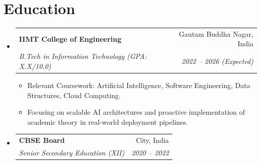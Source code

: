 \documentclass[letterpaper,11pt]{article}
\makeatletter
\newcommand{\resumeItem}[1]{
  \item\small{
    {#1 \vspace{-2pt}}
  }
}
\newcommand{\resumeSubheading}[4]{
  \vspace{-2pt}\item
    \begin{tabular*}{0.97\textwidth}[t]{l@{\extracolsep{\fill}}r}
      \textbf{#1} & #2 \\
      \textit{\small#3} & \textit{\small #4} \\
    \end{tabular*}\vspace{-7pt}
}
\newcommand{\resumeSubHeadingListStart}{\begin{itemize}[leftmargin=0.15in, label={}]}
\newcommand{\resumeSubHeadingListEnd}{\end{itemize}}
\newcommand{\resumeItemListStart}{\begin{itemize}}
\newcommand{\resumeItemListEnd}{\end{itemize}\vspace{-5pt}}
\makeatother
\begin{document}
\section{Education}
  \resumeSubHeadingListStart
    \resumeSubheading
      {IIMT College of Engineering}{Gautam Buddha Nagar, India}
      {B.Tech in Information Technology (GPA: X.X/10.0)}{2022 -- 2026 (Expected)}
      \resumeItemListStart
        \resumeItem{Relevant Coursework: Artificial Intelligence, Software Engineering, Data Structures, Cloud Computing.}
        \resumeItem{Focusing on scalable AI architectures and proactive implementation of academic theory in real-world deployment pipelines.}
      \resumeItemListEnd
    \resumeSubheading
      {CBSE Board}{City, India}
      {Senior Secondary Education (XII)}{2020 -- 2022}
  \resumeSubHeadingListEnd


\end{document}
